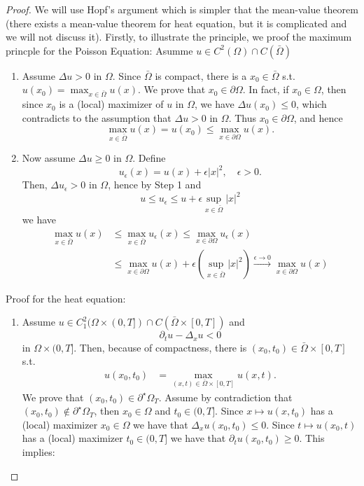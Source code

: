 \documentclass{report}
\theoremstyle{tommy}
\begin{document}
  \begin{proof}
    We will use Hopf's argument which is simpler that the mean-value theorem (there exists a mean-value theorem for heat equation, but it is complicated and we will not discuss it).
    Firstly, to illustrate the principle, we proof the maximum princple for the Poisson Equation:
    Asumme \(u \in C^2(\Omega) \cap C(\bar \Omega)\)
    \begin{enumerate}[label=Step \arabic*)]
      \item Assume \(\Delta u > 0\) in \(\Omega\). Since \(\bar \Omega\) is compact, there is a \(x_0 \in \bar \Omega\) s.t. \(u(x_0) = \max_{x \in \bar \Omega} u(x)\). We prove that \(x_0 \in \partial \Omega\). In fact, if \(x_0 \in \Omega\), then since \(x_0\) is a (local) maximizer of \(u\) in \(\Omega\), we have \(\Delta u(x_0) \le 0\), which contradicts to the assumption that \(\Delta u > 0\) in \(\Omega\). Thus \(x_0 \in \partial \Omega\), and hence 
      \[\max_{x \in \bar \Omega} u(x) = u(x_0) \le \max_{x \in \partial \Omega} u(x).\]
      \item  Now assume \(\Delta u \ge 0\) in \(\Omega\). Define
      \[u_\epsilon(x) = u(x) + \epsilon |x|^2, \quad \epsilon > 0.\]
      Then, \(\Delta u_\epsilon > 0\) in \(\Omega\), hence by Step 1 and
      \[u \le u_\epsilon \le u + \epsilon \sup_{x \in \bar \Omega} |x|^2\]
      we have 
      \begin{align*}
        \max_{x \in \bar \Omega} u(x) 
        &\le \max_{x \in \bar \Omega} u_\epsilon(x) 
        \le \max_{x \in \partial \Omega} u_\epsilon(x) \\
        &\le \max_{x \in \partial \Omega} u(x) + \epsilon \left(\sup_{x \in \bar \Omega} |x|^2\right)
        \xrightarrow{\epsilon \to 0} \max_{x \in \partial \Omega} u(x)
      \end{align*}
    \end{enumerate}
    Proof for the heat equation:
    \begin{enumerate}[label=Step \arabic*)]
      \item Assume \(u \in C_1^2(\Omega \times (0,T]) \cap C(\bar \Omega \times [0,T])\) and \[\partial_t u - \Delta_x u < 0\]
      in \(\Omega \times (0,T]\). Then, because of compactness, there is \((x_0, t_0) \in \bar \Omega \times [0,T]\) s.t. 
      \begin{align*}
        u(x_0, t_0) &= \max_{(x,t) \in \bar \Omega \times [0,T]} u(x,t).
      \end{align*}
      We prove that \((x_0, t_0) \in \partial^\star \Omega_T\). Assume by contradiction that \((x_0, t_0) \notin \partial^\star \Omega_T\), then \(x_0 \in \Omega\) and \(t_0 \in (0,T]\). Since \(x \mapsto u(x,t_0)\) has a (local) maximizer \(x_0 \in \Omega\) we have that \(\Delta_x u(x_0, t_0) \le 0\). Since \(t \mapsto u(x_0, t)\) has a (local) maximizer \(t_0 \in (0,T]\) we have that \(\partial_t u(x_0, t_0) \ge 0\). This implies:

\end{enumerate}
\end{proof}
\end{document}
